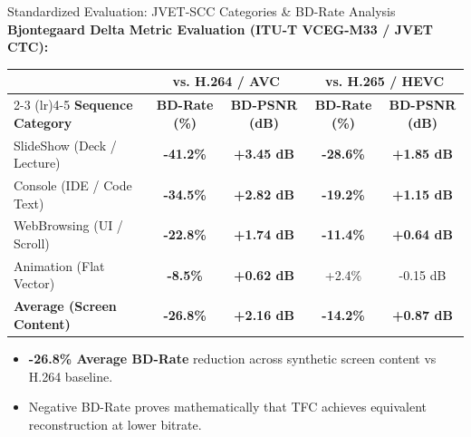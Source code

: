 \documentclass[aspectratio=169, 10pt]{beamer}
\begin{document}
\begin{frame}{Standardized Evaluation: JVET-SCC Categories \& BD-Rate Analysis}
    \textbf{Bjontegaard Delta Metric Evaluation (ITU-T VCEG-M33 / JVET CTC):}
    \vspace{2mm}
    \begin{center}
    \small
    \begin{tabular}{lcccc}
        \toprule
        & \multicolumn{2}{c}{\textbf{vs. H.264 / AVC}} & \multicolumn{2}{c}{\textbf{vs. H.265 / HEVC}} \\
        \cmidrule(lr){2-3} \cmidrule(lr){4-5}
        \textbf{Sequence Category} & \textbf{BD-Rate (\%)} & \textbf{BD-PSNR (dB)} & \textbf{BD-Rate (\%)} & \textbf{BD-PSNR (dB)} \\
        \midrule
        SlideShow (Deck / Lecture) & \textbf{-41.2\%} & \textbf{+3.45 dB} & \textbf{-28.6\%} & \textbf{+1.85 dB} \\
        Console (IDE / Code Text) & \textbf{-34.5\%} & \textbf{+2.82 dB} & \textbf{-19.2\%} & \textbf{+1.15 dB} \\
        WebBrowsing (UI / Scroll) & \textbf{-22.8\%} & \textbf{+1.74 dB} & \textbf{-11.4\%} & \textbf{+0.64 dB} \\
        Animation (Flat Vector) & \textbf{-8.5\%} & \textbf{+0.62 dB} & +2.4\% & -0.15 dB \\
        \midrule
        \textbf{Average (Screen Content)} & \textbf{-26.8\%} & \textbf{+2.16 dB} & \textbf{-14.2\%} & \textbf{+0.87 dB} \\
        \bottomrule
    \end{tabular}
    \end{center}
    \vspace{1mm}
    \begin{itemize}
        \item \textbf{-26.8\% Average BD-Rate} reduction across synthetic screen content vs H.264 baseline.
        \item Negative BD-Rate proves mathematically that TFC achieves equivalent reconstruction at lower bitrate.
    \end{itemize}
\end{frame}
\end{document}
